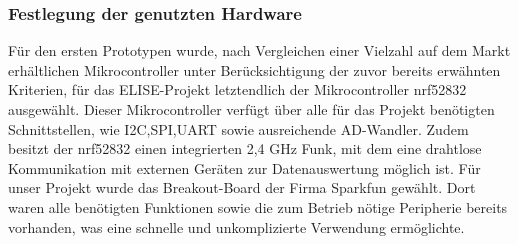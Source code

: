 \subsubsection{Festlegung der genutzten Hardware} \label{festlegung-1}

Für den ersten Prototypen wurde, nach Vergleichen einer Vielzahl auf dem Markt erhältlichen Mikrocontroller unter Berücksichtigung der zuvor bereits erwähnten Kriterien, für das ELISE-Projekt letztendlich der Mikrocontroller nrf52832 ausgewählt. Dieser Mikrocontroller verfügt über alle für das Projekt benötigten Schnittstellen, wie I2C,SPI,UART sowie ausreichende AD-Wandler. Zudem besitzt der nrf52832 einen integrierten 2,4 GHz Funk, mit dem eine drahtlose Kommunikation mit externen Geräten zur Datenauswertung möglich ist. Für unser Projekt wurde das Breakout-Board der Firma Sparkfun gewählt. Dort waren alle benötigten Funktionen sowie die zum Betrieb nötige Peripherie bereits vorhanden, was eine schnelle und unkomplizierte Verwendung ermöglichte.




